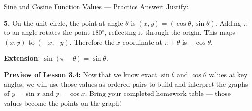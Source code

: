 \documentclass[10pt]{article}
\begin{document}
\begin{notesbox}{Sine and Cosine Function Values --- Practice}
Answer:  \quad Justify: 

\vspace{0.12in}

\textbf{5.} On the unit circle, the point at angle $\theta$ is $(x, y) = (\cos\theta, \sin\theta)$.
Adding $\pi$ to an angle rotates the point $180^\circ$, reflecting it through the origin.
This maps $(x, y)$ to $(-x, -y)$.
Therefore the $x$-coordinate at $\pi + \theta$ is $-\cos\theta$.


\end{notesbox}

\begin{extensionbox}
\textbf{Extension:} $\sin(\pi - \theta) = \sin\theta$.

\end{extensionbox}

\vspace{0.1in}

\begin{tcolorbox}[colback=goldbg, colframe=goldacc, arc=2mm,
    left=3mm, right=3mm, top=2mm, bottom=2mm]
\small\textbf{Preview of Lesson 3.4:} Now that we know exact $\sin\theta$ and $\cos\theta$ values
at key angles, we will use those values as ordered pairs to build and interpret the
graphs of $y = \sin x$ and $y = \cos x$. Bring your completed homework table --- those
values become the points on the graph!
\end{tcolorbox}
\end{document}
